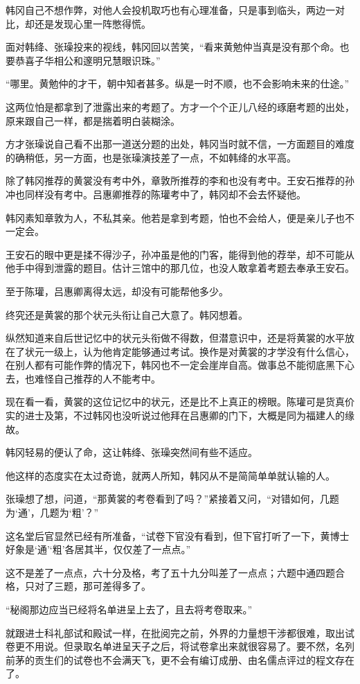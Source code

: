 韩冈自己不想作弊，对他人会投机取巧也有心理准备，只是事到临头，两边一对比，却还是发现心里一阵憋得慌。

面对韩绛、张璪投来的视线，韩冈回以苦笑，“看来黄勉仲当真是没有那个命。也要恭喜子华相公和邃明兄慧眼识珠。”

“哪里。黄勉仲的才干，朝中知者甚多。纵是一时不顺，也不会影响未来的仕途。”

这两位怕是都拿到了泄露出来的考题了。方才一个个正儿八经的琢磨考题的出处，原来跟自己一样，都是揣着明白装糊涂。

方才张璪说自己看不出那一道送分题的出处，韩冈当时就不信，一方面题目的难度的确稍低，另一方面，也是张璪演技差了一点，不如韩绛的水平高。

除了韩冈推荐的黄裳没有考中外，章敦所推荐的李和也没有考中。王安石推荐的孙冲也同样没有考中。吕惠卿推荐的陈瓘考中了，韩冈却不会去怀疑他。

韩冈素知章敦为人，不私其亲。他若是拿到考题，怕也不会给人，便是亲儿子也不一定会。

王安石的眼中更是揉不得沙子，孙冲虽是他的门客，能得到他的荐举，却不可能从他手中得到泄露的题目。估计三馆中的那几位，也没人敢拿着考题去奉承王安石。

至于陈瓘，吕惠卿离得太远，却没有可能帮他多少。

终究还是黄裳的那个状元头衔让自己大意了。韩冈想着。

纵然知道来自后世记忆中的状元头衔做不得数，但潜意识中，还是将黄裳的水平放在了状元一级上，认为他肯定能够通过考试。换作是对黄裳的才学没有什么信心，在别人都有可能作弊的情况下，韩冈也不一定会崖岸自高。做事总不能彻底黑下心去，也难怪自己推荐的人不能考中。

现在看一看，黄裳的这位记忆中的状元，还是比不上真正的榜眼。陈瓘可是货真价实的进士及第，不过韩冈也没听说过他拜在吕惠卿的门下，大概是同为福建人的缘故。

韩冈轻易的便认了命，这让韩绛、张璪突然间有些不适应。

他这样的态度实在太过奇诡，就两人所知，韩冈从不是简简单单就认输的人。

张璪想了想，问道，“那黄裳的考卷看到了吗？”紧接着又问，“对错如何，几题为‘通’，几题为‘粗’？”

这名堂后官显然已经有所准备，“试卷下官没有看到，但下官打听了一下，黄博士好象是‘通’‘粗’各居其半，仅仅差了一点点。”

这不是差了一点点，六十分及格，考了五十九分叫差了一点点；六题中通四题合格，只对了三题，那可差得多了。

“秘阁那边应当已经将名单进呈上去了，且去将考卷取来。”

就跟进士科礼部试和殿试一样，在批阅完之前，外界的力量想干涉都很难，取出试卷更不用说。但录取名单进呈天子之后，将试卷拿出来就很容易了。要不然，名列前茅的贡生们的试卷也不会满天飞，更不会有编订成册、由名儒点评过的程文存在了。

